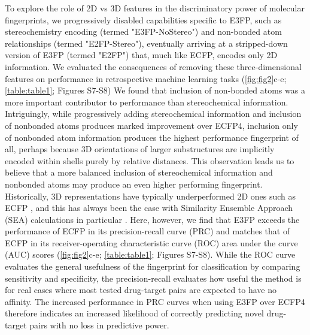 \documentclass[../../main.tex]{subfiles}
\begin{document}
\begin{refsection}
	To explore the role of 2D vs 3D features in the discriminatory power of molecular fingerprints, we progressively disabled capabilities specific to E3FP, such as stereochemistry encoding (termed "E3FP-NoStereo") and non-bonded atom relationships (termed "E2FP-Stereo"), eventually arriving at a stripped-down version of E3FP (termed "E2FP") that, much like ECFP, encodes only 2D information.
	We evaluated the consequences of removing these three-dimensional features on performance in retrospective machine learning tasks (\eg \cref{fig:fig2}c-e; \cref{table:table1}; Figures S7-S8) We found that inclusion of non-bonded atoms was a more important contributor to performance than stereochemical information.
	Intriguingly, while progressively adding stereochemical information and inclusion of nonbonded atoms produces marked improvement over ECFP4, inclusion only of nonbonded atom information produces the highest performance fingerprint of all, perhaps because 3D orientations of larger substructures are implicitly encoded within shells purely by relative distances.
	This observation leads us to believe that a more balanced inclusion of stereochemical information and nonbonded atoms may produce an even higher performing fingerprint.
	Historically, 3D representations have typically underperformed 2D ones such as ECFP  \supercite{maggiora_2014}, and this has always been the case with Similarity Ensemble Approach (SEA) calculations in particular \supercite{hert_2008}.
	Here, however, we find that E3FP exceeds the performance of ECFP in its precision-recall curve (PRC) and matches that of ECFP in its receiver-operating characteristic curve (ROC) area under the curve (AUC) scores (\cref{fig:fig2}c-e; \cref{table:table1}; Figures S7-S8).
	While the ROC curve evaluates the general usefulness of the fingerprint for classification by comparing sensitivity and specificity, the precision-recall evaluates how useful the method is for real cases where most tested drug-target pairs are expected to have no affinity.
	The increased performance in PRC curves when using E3FP over ECFP4 therefore indicates an increased likelihood of correctly predicting novel drug-target pairs with no loss in predictive power.


\end{refsection}
\end{document}
